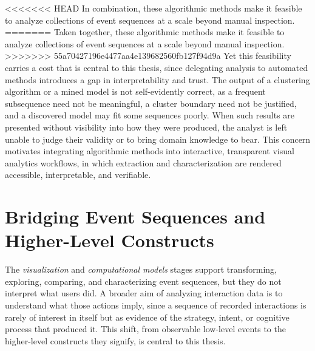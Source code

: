 <<<<<<< HEAD
In combination, these algorithmic methods make it feasible to analyze collections of event sequences at a scale beyond manual inspection.
=======
Taken together, these algorithmic methods make it feasible to analyze collections of event sequences at a scale beyond manual inspection.
>>>>>>> 55a70427196e4477aa4e139682560fb127f94d9a
Yet this feasibility carries a cost that is central to this thesis, since delegating analysis to automated methods introduces a gap in interpretability and trust.
The output of a clustering algorithm or a mined model is not self-evidently correct, as a frequent subsequence need not be meaningful, a cluster boundary need not be justified, and a discovered model may fit some sequences poorly.
When such results are presented without visibility into how they were produced, the analyst is left unable to judge their validity or to bring domain knowledge to bear.
This concern motivates integrating algorithmic methods into interactive, transparent visual analytics workflows, in which extraction and characterization are rendered accessible, interpretable, and verifiable.




\section{Bridging Event Sequences and Higher-Level Constructs}

The \textit{visualization} and \textit{computational models} stages support transforming, exploring, comparing, and characterizing event sequences, but they do not interpret what users did.
A broader aim of analyzing interaction data is to understand what those actions imply, since a sequence of recorded interactions is rarely of interest in itself but as evidence of the strategy, intent, or cognitive process that produced it.
This shift, from observable low-level events to the higher-level constructs they signify, is central to this thesis.

